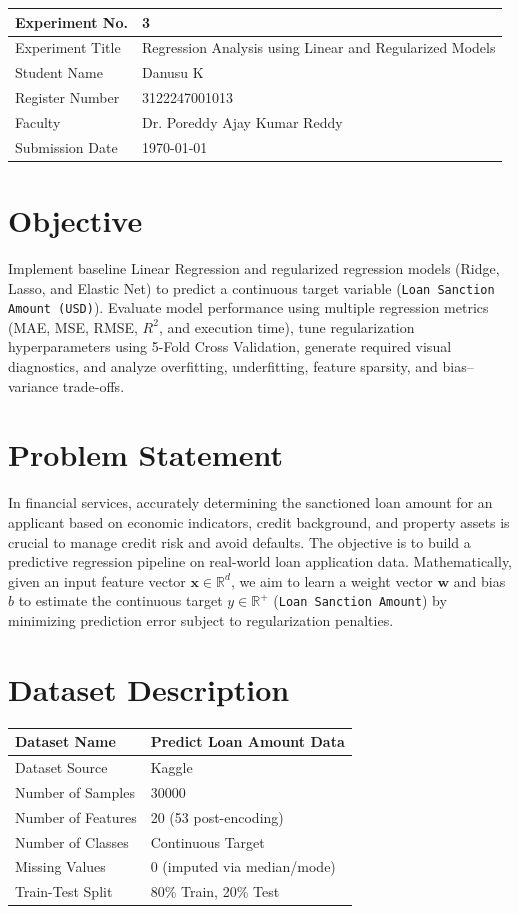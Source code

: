 \documentclass[12pt,a4paper]{article}
\begin{document}
\begin{tabular}{|p{4cm}|p{11cm}|}
\hline
Experiment No. & 3 \\ \hline
Experiment Title & Regression Analysis using Linear and Regularized Models\footnotemark \\ \hline
Student Name & Danusu K \\ \hline
Register Number & 3122247001013 \\ \hline
Faculty & Dr. Poreddy Ajay Kumar Reddy \\ \hline
Submission Date & \today \\ \hline
\end{tabular}

\section{Objective}
Implement baseline Linear Regression and regularized regression models (Ridge, Lasso, and Elastic Net) to predict a continuous target variable (\texttt{Loan Sanction Amount (USD)}). Evaluate model performance using multiple regression metrics (MAE, MSE, RMSE, $R^2$, and execution time), tune regularization hyperparameters using 5-Fold Cross Validation, generate required visual diagnostics, and analyze overfitting, underfitting, feature sparsity, and bias--variance trade-offs.

\section{Problem Statement}
In financial services, accurately determining the sanctioned loan amount for an applicant based on economic indicators, credit background, and property assets is crucial to manage credit risk and avoid defaults. The objective is to build a predictive regression pipeline on real-world loan application data. Mathematically, given an input feature vector $\mathbf{x} \in \mathbb{R}^d$, we aim to learn a weight vector $\mathbf{w}$ and bias $b$ to estimate the continuous target $y \in \mathbb{R}^+$ (\texttt{Loan Sanction Amount}) by minimizing prediction error subject to regularization penalties.

\section{Dataset Description}
\begin{longtable}{|p{6cm}|p{8cm}|}
\hline
Dataset Name & Predict Loan Amount Data \\ \hline
Dataset Source & Kaggle \\ \hline
Number of Samples & 30000 \\ \hline
Number of Features & 20 (53 post-encoding) \\ \hline
Number of Classes & Continuous Target \\ \hline
Missing Values & 0 (imputed via median/mode) \\ \hline
Train-Test Split & 80\% Train, 20\% Test \\ \hline
\end{longtable}
\end{document}
